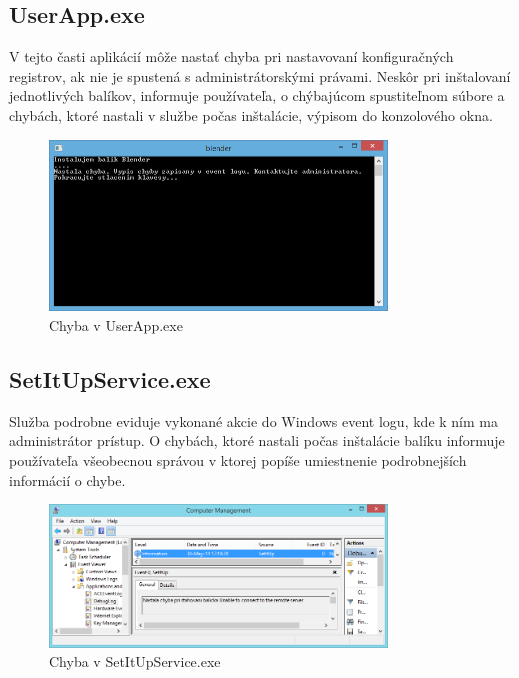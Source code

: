 \subsection{UserApp.exe}
V tejto časti aplikácií môže nastať chyba pri nastavovaní konfiguračných registrov, ak nie je spustená s administrátorskými právami. Neskôr pri inštalovaní jednotlivých balíkov, informuje používateľa, o chýbajúcom spustiteľnom súbore a chybách, ktoré nastali v službe počas inštalácie, výpisom do konzolového okna.
\begin{figure}[h]
    \centering
    \includegraphics[width=0.8\textwidth]{installerror}
    \caption{Chyba v UserApp.exe}
    \label{fig:installerror}
\end{figure}

\subsection{SetItUpService.exe}
Služba podrobne eviduje vykonané akcie do Windows event logu, kde k ním ma administrátor prístup. O chybách, ktoré nastali počas inštalácie balíku informuje používateľa všeobecnou správou v ktorej popíše umiestnenie podrobnejších informácií o chybe.
\begin{figure}[h]
    \centering
    \includegraphics[width=0.8\textwidth]{errorservice}
    \caption{Chyba v SetItUpService.exe}
    \label{fig:serviceerror}
\end{figure}
